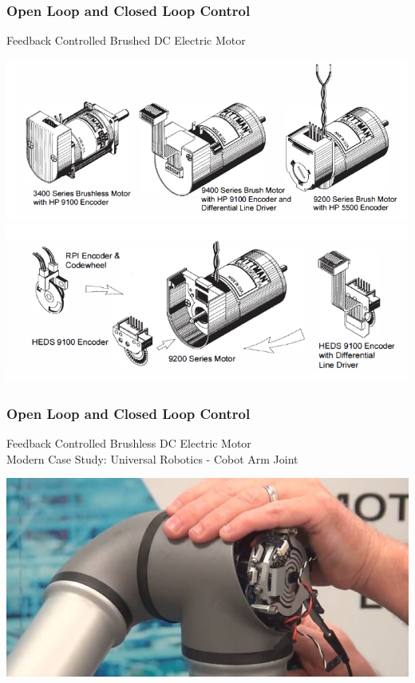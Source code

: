 \documentclass[fleqn]{beamer} %
\newcommand{\sectiontitleII}{Open Loop and Closed Loop Control}
\begin{document}
	\begin{frame} \small
		\frametitle{\sectiontitleII}

		Feedback Controlled Brushed DC Electric Motor

		\includegraphics[scale=0.25]{images/pittman_encoder_01.png} \\
	
		\includegraphics[scale=0.25]{images/pittman_encoder_02.png}	

	\end{frame}

	\begin{frame} \small
		\frametitle{\sectiontitleII}

		Feedback Controlled Brushless DC Electric Motor \\

		Modern Case Study: Universal Robotics - Cobot Arm Joint

		\includegraphics[scale=.25]{images/UR3-Joint-Replacement.jpg}
	
	\end{frame}
\end{document}
